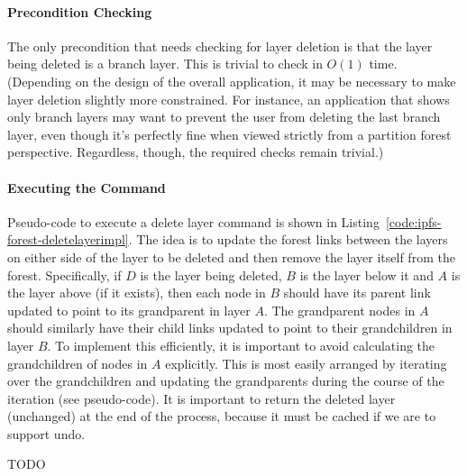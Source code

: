 \paragraph{Precondition Checking}

The only precondition that needs checking for layer deletion is that the layer being deleted is a branch layer. This is trivial to check in $O(1)$ time. (Depending on the design of the overall application, it may be necessary to make layer deletion slightly more constrained. For instance, an application that shows only branch layers may want to prevent the user from deleting the last branch layer, even though it's perfectly fine when viewed strictly from a partition forest perspective. Regardless, though, the required checks remain trivial.)

\paragraph{Executing the Command}

Pseudo-code to execute a delete layer command is shown in Listing~\ref{code:ipfs-forest-deletelayerimpl}. The idea is to update the forest links between the layers on either side of the layer to be deleted and then remove the layer itself from the forest. Specifically, if $D$ is the layer being deleted, $B$ is the layer below it and $A$ is the layer above (if it exists), then each node in $B$ should have its parent link updated to point to its grandparent in layer $A$. The grandparent nodes in $A$ should similarly have their child links updated to point to their grandchildren in layer $B$. To implement this efficiently, it is important to avoid calculating the grandchildren of nodes in $A$ explicitly. This is most easily arranged by iterating over the grandchildren and updating the grandparents during the course of the iteration (see pseudo-code). It is important to return the deleted layer (unchanged) at the end of the process, because it must be cached if we are to support undo.

TODO

